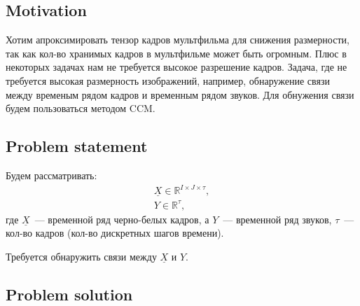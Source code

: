 \documentclass[../../main.tex]{subfiles}
\begin{document}
\subsection{Motivation}

Хотим апроксимировать тензор кадров мультфильма для снижения размерности, так как кол-во хранимых кадров в мультфильме может быть огромным.
Плюс в некоторых задачах нам не требуется высокое разрешение кадров.
Задача, где не требуется высокая размерность изображений, например, обнаружение связи между временым рядом кадров и временным рядом звуков.
Для обнужения связи будем пользоваться методом CCM.

\subsection{Problem statement}

Будем рассматривать: 
\begin{gather*}
    \underline{X} \in \mathbb{R}^{I \times J \times \tau}, \\
    Y \in \mathbb{R}^{\tau},
\end{gather*}
где $\underline{X}$~--- временной ряд черно-белых кадров, а $Y$~--- временной ряд звуков, $\tau$~--- кол-во кадров (кол-во дискретных шагов времени).

Требуется обнаружить связи между $\underline{X}$ и $Y$.

\subsection{Problem solution}
\end{document}
